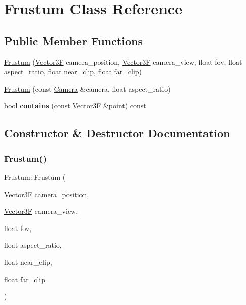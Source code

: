 \hypertarget{class_frustum}{}\section{Frustum Class Reference}
\label{class_frustum}
\subsection*{Public Member Functions}
\begin{DoxyCompactItemize}
\item 
\mbox{\hyperlink{class_frustum_ac79d027bdeb3a365e360b41280813aca}{Frustum}} (\mbox{\hyperlink{class_vector3}{Vector3F}} camera\+\_\+position, \mbox{\hyperlink{class_vector3}{Vector3F}} camera\+\_\+view, float fov, float aspect\+\_\+ratio, float near\+\_\+clip, float far\+\_\+clip)
\item 
\mbox{\hyperlink{class_frustum_a5ac3dd6a67b1a705570bbb113aa8b923}{Frustum}} (const \mbox{\hyperlink{class_camera}{Camera}} \&camera, float aspect\+\_\+ratio)
\item 
\mbox{\label{class_frustum_a446362a4ddf7de9775eb13be131ec228}} 
bool {\bfseries contains} (const \mbox{\hyperlink{class_vector3}{Vector3F}} \&point) const
\end{DoxyCompactItemize}


\subsection{Constructor \& Destructor Documentation}
\mbox{\label{class_frustum_ac79d027bdeb3a365e360b41280813aca}} 
\subsubsection{\texorpdfstring{Frustum()}{Frustum()}\hspace{0.1cm}{\footnotesize\ttfamily [1/2]}}
{\footnotesize\ttfamily Frustum\+::\+Frustum (\begin{DoxyParamCaption}\item[{\mbox{\hyperlink{class_vector3}{Vector3F}}}]{camera\+\_\+position,  }\item[{\mbox{\hyperlink{class_vector3}{Vector3F}}}]{camera\+\_\+view,  }\item[{float}]{fov,  }\item[{float}]{aspect\+\_\+ratio,  }\item[{float}]{near\+\_\+clip,  }\item[{float}]{far\+\_\+clip }\end{DoxyParamCaption})}

